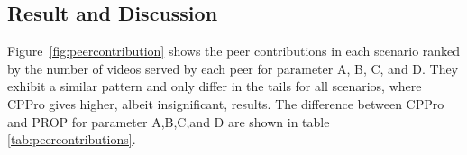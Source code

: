 \documentclass[10pt,final,journal,a4paper]{IEEEtran}
\begin{document}









\subsection{Result and Discussion}\label{resultanddiscussion}

Figure~\ref{fig:peercontribution} shows the peer contributions in each scenario ranked by the number of videos served by each peer for parameter A, B, C, and D.
They exhibit a similar pattern and only differ in the tails for all scenarios, where CPPro gives higher, albeit insignificant, results.
The difference between CPPro and PROP for parameter A,B,C,and D are shown in table \ref{tab:peercontributions}.
\end{document}

